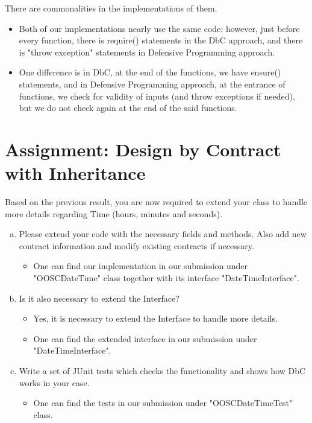 \documentclass[a4paper,12pt,oneside]{scrreprt}
\begin{document}
\begin{enumerate}[a)]
\end{enumerate}

\section{Assignment: Design by Contract with Inheritance}
Based on the previous result, you are now required to extend your class to handle more details regarding Time (hours, minutes and seconds).

\begin{enumerate}[a)]
	\item Please extend your code with the necessary fields and methods. Also add new contract information and modify existing contracts if necessary.

		\begin{itemize}
			\item One can find our implementation in our submission under "OOSCDateTime" class together with its interface "DateTimeInterface".
		\end{itemize}

	\item Is it also necessary to extend the Interface?

		\begin{itemize}
			\item Yes, it is necessary to extend the Interface to handle more details.
			\item One can find the extended interface in our submission under "DateTimeInterface".
		\end{itemize}

	\item Write a set of JUnit tests which checks the functionality and shows how DbC works in your case.

		\begin{itemize}
			\item One can find the tests in our submission under "OOSCDateTimeTest" class.
		\end{itemize}

\end{enumerate}
\end{document}
